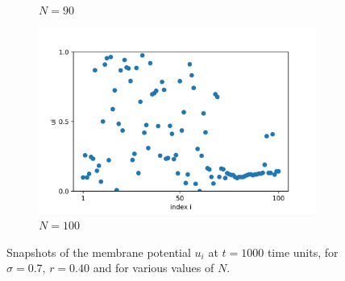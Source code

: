 \documentclass[a4paper,12pt]{article}
\begin{document}
\begin{figure}[H]
\begin{subfigure}{.32\textwidth}
  \caption{$N=90$}
\end{subfigure}
\hfill
\begin{subfigure}{.32\textwidth}
  \centering
  \includegraphics[width=1\linewidth]{u_N=100.png}  
  \caption{$N=100$}
\end{subfigure}
\caption{Snapshots of the membrane potential $u_i$ at $t=1000$ time units, for $\sigma = 0.7$, $r=0.40$ and for various values of $N$.}
\label{vsN}
\end{figure}
\end{document}
